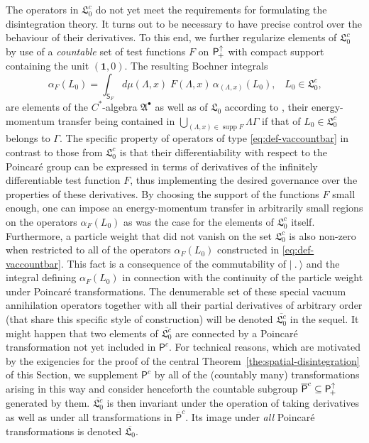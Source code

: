\documentclass[a4paper,a4paper]{article}
\numberwithin{equation}{section}
\newcommand{\Lfrak}{\mathfrak{L}}
\newcommand{\Ssf}{\mathsf{S}}
\newcommand{\unit}{\mathbf{1}}
\newcommand{\Poin}{\mathsf{P}_{\negthinspace +}^\uparrow}
\newcommand{\aLax}{\alpha_{( \Lambda , x )}}
\newcommand{\Pcount}{\mathsf{P}^c}
\newcommand{\Pbarcount}{\overline{\mathsf{P}}^c}
\newcommand{\vacbar}{\overline{\mathfrak{L}_0}}
\newcommand{\vaccount}{\mathfrak{L}_0^c}
\newcommand{\vaccountbar}{\overline{\mathfrak{L}_0^c}}
\newcommand{\Abullet}{\mathfrak{A}^\bullet}
\theoremstyle{definition}
\theoremstyle{plain}
\theoremstyle{remark}
\theoremstyle{assumption}
\DeclareMathOperator{\supp}{supp}
\newcommand{\ket}[1]{\vert #1 \rangle}
\begin{document}
  The operators in $\vaccount$ do not yet meet the requirements for
  formulating the disintegration theory. It turns out to be necessary
  to have precise control over the behaviour of their derivatives. To
  this end, we further regularize elements of $\vaccount$ by use of a
  \emph{countable} set of test functions $F$ on $\Poin$ with compact
  support containing the unit $( \unit , 0 )$. The resulting Bochner
  integrals
  \begin{equation}
    \label{eq:def-vaccountbar}
    \alpha_F ( L_0 ) = \int_{\Ssf_F} d \mu ( \Lambda , x ) \; F (
    \Lambda , x ) \, \aLax ( L_0 ) \text{,} \quad L_0 \in \vaccount
    \text{,}
  \end{equation}
  are elements of the $C^*$-algebra $\Abullet$ as well as of
  $\Lfrak_0$ according to \cite[Lemma~4.6]{porrmann:2002a}, their
  energy-momentum transfer being contained in $\bigcup_{( \Lambda , x
  ) \in \supp F} \Lambda \Gamma$ if that of $L_0 \in \vaccount$
  belongs to $\Gamma$. The specific property of operators of type
  \eqref{eq:def-vaccountbar} in contrast to those from $\vaccount$ is
  that their differentiability with respect to the Poincar\'e group
  can be expressed in terms of derivatives of the infinitely
  differentiable test function $F$, thus implementing the desired
  governance over the properties of these derivatives. By choosing the
  support of the functions $F$ small enough, one can impose an
  energy-momentum transfer in arbitrarily small regions on the
  operators $\alpha_F ( L_0 )$ as was the case for the elements of
  $\vaccount$ itself.  Furthermore, a particle weight that did not
  vanish on the set $\vaccount$ is also non-zero when restricted to
  all of the operators $\alpha_F ( L_0 )$ constructed in
  \eqref{eq:def-vaccountbar}. This fact is a consequence of the
  commutability of $\ket{~.~}$ and the integral defining $\alpha_F (
  L_0 )$ \cite[Lemma~5.4]{porrmann:2002a} in connection with the
  continuity of the particle weight under Poincar\'e transformations.
  The denumerable set of these special vacuum annihilation operators
  together with all their partial derivatives of arbitrary order (that
  share this specific style of construction) will be denoted
  $\vaccountbar$ in the sequel. It might happen that two elements of
  $\vaccountbar$ are connected by a Poincar\'e transformation not yet
  included in $\Pcount$. For technical reasons, which are motivated by
  the exigencies for the proof of the central
  Theorem~\ref{the:spatial-disintegration} of this Section, we
  supplement $\Pcount$ by all of the (countably many) transformations
  arising in this way and consider henceforth the countable subgroup
  $\Pbarcount \subseteq \Poin$ generated by them.  $\vaccountbar$ is
  then invariant under the operation of taking derivatives as well as
  under all transformations in $\Pbarcount$. Its image under
  \emph{all} Poincar\'e transformations is denoted $\vacbar$.
  
\end{document}
